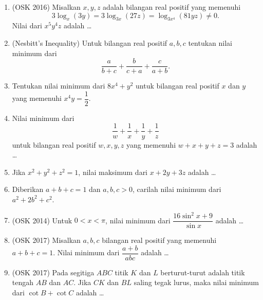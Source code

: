 \documentclass[11pt]{scrartcl}
\begin{document}
\begin{enumerate}
        \item (OSK 2016) Misalkan $x,y,z$ adalah bilangan real positif yang memenuhi $$3 \log_x (3y) = 3 \log_{3x} (27z) = \log_{3x^4} (81yz) \neq 0.$$ Nilai dari $x^5y^4z$ adalah \dots
        
        \item (Nesbitt's Inequality) Untuk bilangan real positif $a,b,c$ tentukan nilai minimum dari $$\dfrac{a}{b+c}+\dfrac{b}{c+a}+\dfrac{c}{a+b}.$$
        
        \item Tentukan nilai minimum dari $8x^4+y^2$ untuk bilangan real positif $x$ dan $y$ yang memenuhi $x^4y=\dfrac{1}{2}$.
        
        \item Nilai minimum dari $$\dfrac{1}{w}+\dfrac{1}{x}+\dfrac{1}{y}+\dfrac{1}{z}$$
        untuk bilangan real positif $w,x,y,z$ yang memenuhi $w+x+y+z=3$ adalah \dots
        
        \item Jika $x^2+y^2+z^2=1$, nilai maksimum dari $x+2y+3z$ adalah \dots
        
        \item Diberikan $a+b+c=1$ dan $a,b,c>0$, carilah nilai minimum dari $a^2+2b^2+c^2$.
        
        \item (OSK 2014) Untuk $0 < x < \pi$, nilai minimum dari $\dfrac{16 \sin^2 x + 9}{\sin x}$ adalah \dots
        
        \item (OSK 2017) Misalkan $a,b,c$ bilangan real positif yang memenuhi $a+b+c=1$. Nilai minimum dari $\dfrac{a+b}{abc}$ adalah \dots
        
        \item (OSK 2017) Pada segitiga $ABC$ titik $K$ dan $L$ berturut-turut adalah titik tengah $AB$ dan $AC$. Jika $CK$ dan $BL$ saling tegak lurus, maka nilai minimum dari $\cot B + \cot C$ adalah \dots
\end{enumerate}
\end{document}
